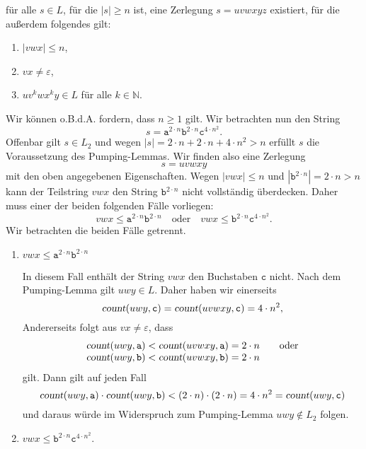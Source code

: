\documentclass{article}
\begin{document}
\begin{enumerate}
      f\"ur alle $s \in L$, f\"ur die $|s| \geq n$ ist, eine Zerlegung $s = uvwxyz$ existiert, f\"ur die
      au{\ss}erdem folgendes gilt:
      \begin{enumerate}
      \item $|vwx| \leq n$,
      \item $vx \not= \varepsilon$,
      \item $uv^kwx^ky \in L$ f\"ur alle $k \in \mathbb{N}$.
      \end{enumerate}
      Wir k\"onnen o.B.d.A. fordern, dass $n \geq 1$ gilt.
      Wir betrachten nun den String
      \[ s = \texttt{a}^{2\cdot n} \texttt{b}^{2\cdot n} \texttt{c}^{4\cdot n^2}. \]
      Offenbar gilt $s \in L_2$ und wegen $|s| = 2 \cdot n + 2 \cdot n + 4 \cdot n^2 > n$ erf\"ullt $s$ die
      Voraussetzung des Pumping-Lemmas.  Wir finden also eine Zerlegung
      \[ s = u v w x y \]
      mit den oben angegebenen Eigenschaften.  Wegen $|vwx| \leq n$ und 
      $| \texttt{b}^{2\cdot n} | = 2\cdot n > n$ kann der Teilstring $vwx$ den String $\texttt{b}^{2\cdot n}$ 
      nicht vollst\"andig \"uberdecken.  Daher muss einer der beiden folgenden F\"alle vorliegen:
      \[ vwx \leq \texttt{a}^{2\cdot n}\texttt{b}^{2\cdot n} \quad \mbox{oder} \quad
         vwx \leq \texttt{b}^{2\cdot n}\texttt{c}^{4\cdot n^2}.
      \]
      Wir betrachten die beiden F\"alle getrennt.
      \begin{enumerate}
      \item $vwx \leq \texttt{a}^{2\cdot n}\texttt{b}^{2\cdot n}$

            In diesem Fall enth\"alt der String $vwx$ den Buchstaben $\texttt{c}$ nicht.
            Nach dem Pumping-Lemma gilt $uwy \in L$. Daher haben wir einerseits
            \[ \textsl{count}(uwy, \texttt{c}) =  \textsl{count}(uvwxy, \texttt{c}) = 4 \cdot n^2, \]
            Andererseits folgt aus $vx \not= \varepsilon$, dass 
            \[ 
            \begin{array}[t]{ll}
               \textsl{count}(uwy, \texttt{a}) < \textsl{count}(uvwxy, \texttt{a}) = 2 \cdot n &
               \quad \mbox{oder} \\
               \textsl{count}(uwy, \texttt{b}) < \textsl{count}(uvwxy, \texttt{b}) = 2 \cdot n
            \end{array}
            \]
            gilt.  Dann gilt auf jeden Fall
            \[ \textsl{count}(uwy, \texttt{a}) \cdot \textsl{count}(uwy, \texttt{b}) < 
               (2 \cdot n) \cdot (2 \cdot n) = 4\cdot n^2 = \textsl{count}(uwy, \texttt{c})
            \]
            und daraus w\"urde im Widerspruch zum Pumping-Lemma $uwy \not\in L_2$ folgen.
      \item $vwx \leq \texttt{b}^{2\cdot n}\texttt{c}^{4\cdot n^2}$.
          

\end{enumerate}
\end{enumerate}
\end{document}
